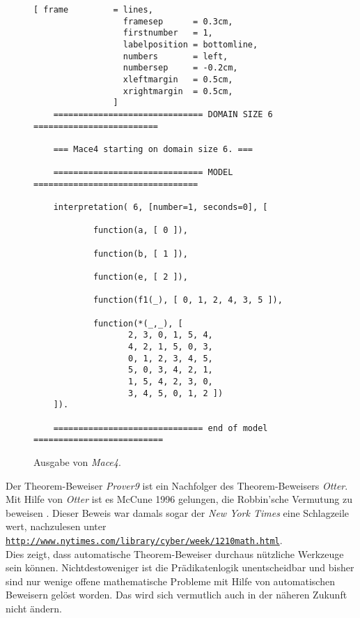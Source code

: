 \begin{figure}[!ht]
\centering
\begin{Verbatim}[ frame         = lines, 
                  framesep      = 0.3cm, 
                  firstnumber   = 1,
                  labelposition = bottomline,
                  numbers       = left,
                  numbersep     = -0.2cm,
                  xleftmargin   = 0.5cm,
                  xrightmargin  = 0.5cm,
                ]
    ============================== DOMAIN SIZE 6 =========================
    
    === Mace4 starting on domain size 6. ===
    
    ============================== MODEL =================================
    
    interpretation( 6, [number=1, seconds=0], [
    
            function(a, [ 0 ]),
    
            function(b, [ 1 ]),
    
            function(e, [ 2 ]),
    
            function(f1(_), [ 0, 1, 2, 4, 3, 5 ]),
    
            function(*(_,_), [
    			   2, 3, 0, 1, 5, 4,
    			   4, 2, 1, 5, 0, 3,
    			   0, 1, 2, 3, 4, 5,
    			   5, 0, 3, 4, 2, 1,
    			   1, 5, 4, 2, 3, 0,
    			   3, 4, 5, 0, 1, 2 ])
    ]).
    
    ============================== end of model ==========================
\end{Verbatim}
\vspace*{-0.3cm}
\caption{Ausgabe von \textsl{Mace4}.}
\label{fig:group.out}
\end{figure}

\remark
Der Theorem-Beweiser \textsl{Prover9} ist ein Nachfolger des Theorem-Beweisers \textsl{Otter}.  Mit Hilfe von
\textsl{Otter} ist es McCune 1996 gelungen, die Robbin'sche Vermutung zu beweisen \cite{mccune:1997}.
Dieser Beweis war damals sogar der \emph{New York Times} eine Schlagzeile wert,
nachzulesen unter
\\[0.2cm]
\hspace*{1.3cm}
\href{http://www.nytimes.com/library/cyber/week/1210math.html}{\texttt{http://www.nytimes.com/library/cyber/week/1210math.html}}.
\\[0.2cm]
Dies zeigt, dass automatische Theorem-Beweiser durchaus n\"{u}tzliche Werkzeuge sein
k\"{o}nnen.  Nichtdestoweniger  ist die Pr\"{a}dikatenlogik unentscheidbar und bisher sind 
nur wenige offene mathematische  Probleme mit Hilfe von automatischen Beweisern gel\"{o}st
worden.  Das wird sich vermutlich auch in der n\"{a}heren Zukunft nicht 
\"{a}ndern.  \eox


